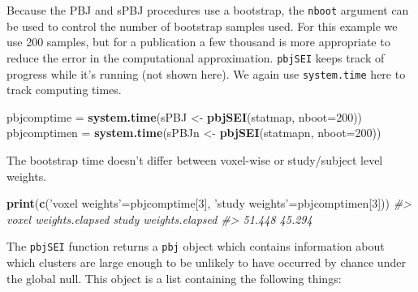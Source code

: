 \documentclass[]{article}
\newenvironment{Shaded}{\begin{snugshade}}{\end{snugshade}}
\newcommand{\CommentTok}[1]{\textcolor[rgb]{0.56,0.35,0.01}{\textit{#1}}}
\newcommand{\DataTypeTok}[1]{\textcolor[rgb]{0.13,0.29,0.53}{#1}}
\newcommand{\DecValTok}[1]{\textcolor[rgb]{0.00,0.00,0.81}{#1}}
\newcommand{\KeywordTok}[1]{\textcolor[rgb]{0.13,0.29,0.53}{\textbf{#1}}}
\newcommand{\NormalTok}[1]{#1}
\newcommand{\StringTok}[1]{\textcolor[rgb]{0.31,0.60,0.02}{#1}}
\begin{document}
Because the PBJ and sPBJ procedures use a bootstrap, the \texttt{nboot}
argument can be used to control the number of bootstrap samples used.
For this example we use 200 samples, but for a publication a few
thousand is more appropriate to reduce the error in the computational
approximation. \texttt{pbjSEI} keeps track of progress while it's
running (not shown here). We again use \texttt{system.time} here to
track computing times.

\begin{Shaded}
\begin{Highlighting}[]
\NormalTok{pbjcomptime  =}\StringTok{ }\KeywordTok{system.time}\NormalTok{(sPBJ  <-}\StringTok{ }\KeywordTok{pbjSEI}\NormalTok{(statmap,  }\DataTypeTok{nboot=}\DecValTok{200}\NormalTok{))}
\NormalTok{pbjcomptimen =}\StringTok{ }\KeywordTok{system.time}\NormalTok{(sPBJn <-}\StringTok{ }\KeywordTok{pbjSEI}\NormalTok{(statmapn, }\DataTypeTok{nboot=}\DecValTok{200}\NormalTok{))}
\end{Highlighting}
\end{Shaded}

The bootstrap time doesn't differ between voxel-wise or study/subject
level weights.

\begin{Shaded}
\begin{Highlighting}[]
\KeywordTok{print}\NormalTok{(}\KeywordTok{c}\NormalTok{(}\StringTok{'voxel weights'}\NormalTok{=pbjcomptime[}\DecValTok{3}\NormalTok{], }\StringTok{'study weights'}\NormalTok{=pbjcomptimen[}\DecValTok{3}\NormalTok{]))}
\CommentTok{#> voxel weights.elapsed study weights.elapsed }
\CommentTok{#>                51.448                45.294}
\end{Highlighting}
\end{Shaded}

The \texttt{pbjSEI} function returns a \texttt{pbj} object which
contains information about which clusters are large enough to be
unlikely to have occurred by chance under the global null. This object
is a list containing the following things:
\end{document}
